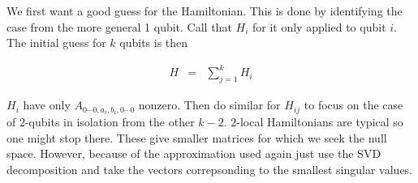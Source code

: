 \documentclass[11pt]{article}
\theoremstyle{change}
\theoremstyle{nonumberplain}
\numberwithin{equation}{section}
\begin{document}
We first want a good guess for the Hamiltonian. This is done by identifying the case from the more general 1 qubit. Call that $H_{i}$ for it only applied to qubit $i$. The initial guess for $k$ qubits is then

\begin{eqnarray*}
H &=& \sum_{j=1}^k H_i
\end{eqnarray*}

$H_i$ have only $A_{0 \cdots 0, a_i , b_i, 0 \cdots 0}$ nonzero. Then do similar for $H_{ij}$ to focus on the case of $2$-qubits in isolation from the other $k-2$. $2$-local Hamiltonians are typical so one might stop there. These give smaller matrices for which we seek the null space. However, because of the approximation used again just use the SVD decomposition and take the vectors correpsonding to the smallest singular values.
\end{document}
